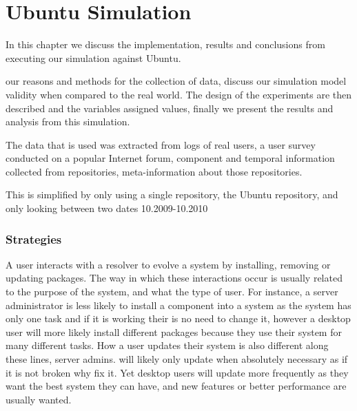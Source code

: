 
\chapter{Ubuntu Simulation}
\label{ubunutsimulation}
In this chapter we discuss the implementation, results and conclusions from executing our simulation against Ubuntu.

{}our reasons and methods for the collection of data,
{}discuss our simulation model validity when compared to the real world.
{}The design of the experiments are then described and the variables assigned values,
{}finally we present the results and analysis from this simulation.

{}The data that is used was extracted from logs of real users, a user survey conducted on a popular Internet forum, 
{}component and temporal information collected from repositories, meta-information about those repositories.


{}This is simplified by only using a single repository, the Ubuntu repository, and only looking between two dates 10.2009-10.2010




\subsection{Strategies}
A user interacts with a resolver to evolve a system by installing, removing or updating packages.
The way in which these interactions occur is usually related to the purpose of the system, and what the type of user.
For instance, a server administrator is less likely to install a component into a system as the system has only one task and if it is working their is no need to change it, 
however a desktop user will more likely install different packages because they use their system for many different tasks.
How a user updates their system is also different along these lines, server admins. will likely only update when absolutely necessary as if it is not broken why fix it.
Yet desktop users will update more frequently as they want the best system they can have, and new features or better performance are usually wanted.

